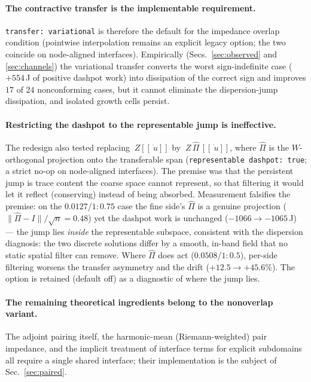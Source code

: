 \documentclass[11pt]{article}
\newcommand{\norm}[1]{\lVert #1 \rVert}
\newcommand{\code}[1]{\texttt{#1}}
\newcommand{\jump}[1]{[\![#1]\!]}
\begin{document}
\paragraph{The contractive transfer is the implementable requirement.}
\code{transfer: variational} is therefore the default for the impedance
overlap condition (pointwise interpolation remains an explicit legacy
option; the two coincide on node-aligned interfaces). Empirically
(Secs.~\ref{sec:observed} and \ref{sec:channels}) the variational transfer
converts the worst
sign-indefinite case ($+554$\,J of positive dashpot work) into dissipation
of the correct sign and improves $17$ of $24$ nonconforming cases, but it
cannot eliminate the dispersion-jump dissipation, and isolated growth cells
persist.

\paragraph{Restricting the dashpot to the representable jump is
ineffective.} The redesign also tested replacing $~Z\jump{\dot{~u}}$ by
$~Z\,\widehat\Pi\,\jump{\dot{~u}}$, where $\widehat\Pi$ is the
$W$-orthogonal projection onto the transferable span
(\code{representable dashpot: true}; a strict no-op on node-aligned
interfaces). The premise was that the persistent jump is trace content the
coarse space cannot represent, so that filtering it would let it reflect
(conserving) instead of being absorbed. Measurement falsifies the premise:
on the $0.0127$/$1{:}0.75$ case the fine side's $\widehat\Pi$ is a genuine
projection ($\norm{\widehat\Pi - I}/\sqrt{n} = 0.48$) yet the dashpot work
is unchanged ($-1066 \to -1065$\,J) --- the jump lies \emph{inside} the
representable subspace, consistent with the dispersion diagnosis: the two
discrete solutions differ by a smooth, in-band field that no static
spatial filter can remove. Where $\widehat\Pi$ does act
($0.0508$/$1{:}0.5$), per-side filtering worsens the transfer asymmetry
and the drift
($+12.5 \to +45.6\%$). The option is retained (default off) as a diagnostic
of where the jump lies.

\paragraph{The remaining theoretical ingredients belong to the nonoverlap
variant.} The adjoint pairing itself, the harmonic-mean (Riemann-weighted)
pair impedance, and the implicit treatment of interface terms for explicit
subdomains all require a single shared interface; their implementation is
the subject of Sec.~\ref{sec:paired}.
\end{document}
